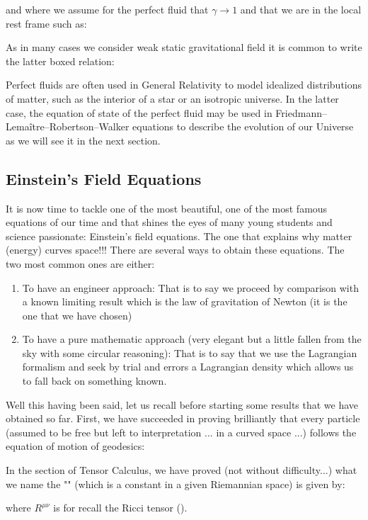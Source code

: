 	and where we assume for the perfect fluid that $\gamma\rightarrow 1$ and that we are in the local rest frame such as:
	
	As in many cases we consider weak static gravitational field it is common to write the latter boxed relation:
	
	Perfect fluids are often used in General Relativity to model idealized distributions of matter, such as the interior of a star or an isotropic universe. In the latter case, the equation of state of the perfect fluid may be used in Friedmann–Lemaître–Robertson–Walker equations to describe the evolution of our Universe as we will see it in the next section.
	
	\pagebreak
	\subsection{Einstein's Field Equations}\label{einstein field equations}
	It is now time to tackle one of the most beautiful, one of the most famous equations of our time and that shines the eyes of many young students and science passionate: Einstein's field equations. The one that explains why matter (energy) curves space!!! There are several ways to obtain these equations. The two most common ones are either:
	\begin{enumerate}
		\item To have an engineer approach: That is to say we proceed by comparison with a known limiting result which is the law of gravitation of Newton (it is the one that we have chosen)

		\item To have a pure mathematic approach (very elegant but a little fallen from the sky with some circular reasoning): That is to say that we use the Lagrangian formalism and seek by trial and errors a Lagrangian density which allows us to fall back on something known.
	\end{enumerate}
	Well this having been said, let us recall before starting some results that we have obtained so far. First, we have succeeded in proving brilliantly that every particle (assumed to be free but left to interpretation ... in a curved space ...) follows the equation of motion of geodesics:
	
	In the section of Tensor Calculus, we have proved (not without difficulty...) what we name the "" (which is a constant in a given Riemannian space) is given by:
	
	where $R^{\mu\nu}$ is for recall the Ricci tensor ().
	
